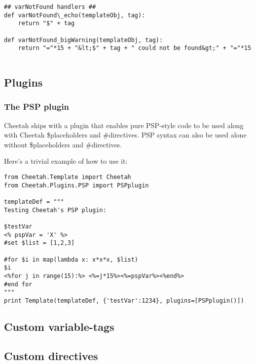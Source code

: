 \begin{verbatim}
## varNotFound handlers ##
def varNotFound\_echo(templateObj, tag):
    return "$" + tag

def varNotFound_bigWarning(templateObj, tag):
    return "="*15 + "&lt;$" + tag + " could not be found&gt;" + "="*15
    
\end{verbatim}




\subsection{Plugins}
\subsubsection{The PSP plugin}
Cheetah ships with a plugin that enables pure PSP-style code to be used along
with Cheetah \$placeholders and \#directives.  PSP syntax can also be used
alone without \$placeholders and \#directives.

Here's a trivial example of how to use it:
\begin{verbatim}
from Cheetah.Template import Cheetah
from Cheetah.Plugins.PSP import PSPplugin

templateDef = """
Testing Cheetah's PSP plugin:
 
$testVar
<% pspVar = 'X' %>
#set $list = [1,2,3]
 
#for $i in map(lambda x: x*x*x, $list)
$i
<%for j in range(15):%> <%=j*15%><%=pspVar%><%end%>
#end for
"""
print Template(templateDef, {'testVar':1234}, plugins=[PSPplugin()])

\end{verbatim}

\subsection{Custom variable-tags}

\subsection{Custom directives}
